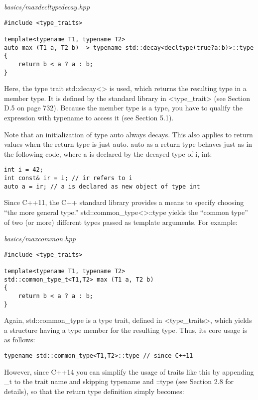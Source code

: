 \noindent
\textit{basics/maxdecltypedecay.hpp}
\begin{lstlisting}[style=styleCXX]
#include <type_traits>

template<typename T1, typename T2>
auto max (T1 a, T2 b) -> typename std::decay<decltype(true?a:b)>::type
{
	return b < a ? a : b;
}
\end{lstlisting}

Here, the type trait std::decay<> is used, which returns the resulting type in a member type. It is defined by the standard library in <type\_trait> (see Section D.5 on page 732). Because the member type is a type, you have to qualify the expression with typename to access it (see Section 5.1).

Note that an initialization of type auto always decays. This also applies to return values when the return type is just auto. auto as a return type behaves just as in the following code, where a is declared by the decayed type of i, int:

\begin{lstlisting}[style=styleCXX]
int i = 42;
int const& ir = i; // ir refers to i
auto a = ir; // a is declared as new object of type int
\end{lstlisting}


Since C++11, the C++ standard library provides a means to specify choosing “the more general type.” std::common\_type<>::type yields the “common type” of two (or more) different types passed as template arguments. For example:

\noindent
\textit{basics/maxcommon.hpp}
\begin{lstlisting}[style=styleCXX]
#include <type_traits>

template<typename T1, typename T2>
std::common_type_t<T1,T2> max (T1 a, T2 b)
{
	return b < a ? a : b;
}
\end{lstlisting}

Again, std::common\_type is a type trait, defined in <type\_traits>, which yields a structure having a type member for the resulting type. Thus, its core usage is as follows:

\begin{lstlisting}[style=styleCXX]
typename std::common_type<T1,T2>::type // since C++11
\end{lstlisting}

However, since C++14 you can simplify the usage of traits like this by appending \_t to the trait name and skipping typename and ::type (see Section 2.8 for details), so that the return type definition simply becomes:

